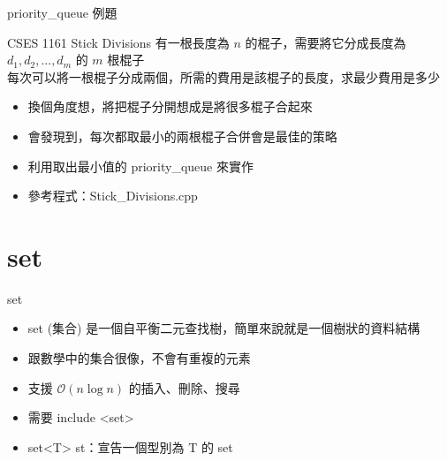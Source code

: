\documentclass[aspectratio=169]{beamer}
\begin{document}
    \begin{frame}{priority\_queue 例題}
        \begin{block}{CSES 1161 Stick Divisions}
            有一根長度為 $n$ 的棍子，需要將它分成長度為 $d_1, d_2, ..., d_m$ 的 $m$ 根棍子\\
            每次可以將一根棍子分成兩個，所需的費用是該棍子的長度，求最少費用是多少
        \end{block}

        \begin{itemize}
            \item<2-> 換個角度想，將把棍子分開想成是將很多棍子合起來
            \item<3-> 會發現到，每次都取最小的兩根棍子合併會是最佳的策略
            \item<4-> 利用取出最小值的 priority\_queue 來實作
            \item<4-> 參考程式：Stick\_Divisions.cpp
        \end{itemize}
    \end{frame}

    \section{set}

    \begin{frame}{set}
        \begin{itemize}
            \item<1-> set (集合) 是一個自平衡二元查找樹，簡單來說就是一個樹狀的資料結構
            \item<1-> 跟數學中的集合很像，不會有重複的元素
            \item<2-> 支援 $\mathcal{O}(n\log n)$ 的插入、刪除、搜尋
            \item<2-> 需要 include <set>
            \item<3-> set<T> st：宣告一個型別為 T 的 set
        \end{itemize}
    \end{frame}
\end{document}
